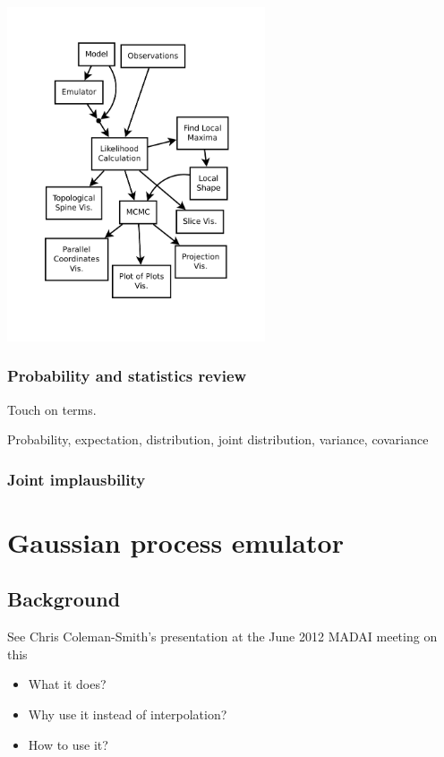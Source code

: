 \documentclass{article}
\begin{document}
\begin{center}
\includegraphics[width=3in]{figures/MADAI_Stats_and_Vis.pdf}
\end{center}


\subsubsection{Probability and statistics review}

Touch on terms.

Probability, expectation, distribution, joint distribution, variance,
covariance

\subsubsection{Joint implausbility}

\section{Gaussian process emulator}

\subsection{Background}

See Chris Coleman-Smith's presentation at the June 2012 MADAI meeting on this

\begin{itemize}

\item What it does?

\item Why use it instead of interpolation?

\item How to use it?

\end{itemize}
\end{document}

